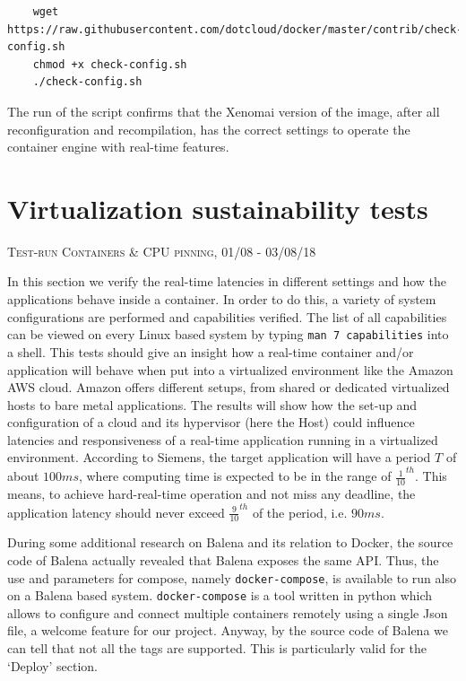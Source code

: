 \documentclass[]{scrartcl}
\begin{document}
\begin{verbatim}
	wget https://raw.githubusercontent.com/dotcloud/docker/master/contrib/check-config.sh
	chmod +x check-config.sh
	./check-config.sh
\end{verbatim}

The run of the script confirms that the Xenomai version of the image, after all reconfiguration and recompilation, has the correct settings to operate the container engine with real-time features.

\section{Virtualization sustainability tests}
\label{sec:virtsust}
{\small\textsc{Test-run Containers \& CPU pinning, 01/08 - 03/08/18} \bigskip}

In this section we verify the real-time latencies in different settings and how the applications behave inside a container. In order to do this, a variety of system configurations are performed and capabilities verified. The list of all capabilities can be viewed on every Linux based system by typing \texttt{man 7 capabilities} into a shell. This tests should give an insight how a real-time container and/or application will behave when put into a virtualized environment like the Amazon AWS cloud. Amazon offers different setups, from shared or dedicated virtualized hosts to bare metal applications. The results will show how the set-up and configuration of a cloud and its  hypervisor (here the Host) could influence latencies and responsiveness of a real-time application running in a virtualized environment. According to Siemens, the target application will have a period $T$ of about $100 ms$, where computing time is expected to be in the range of $\frac{1}{10}^{th}$. This means, to achieve hard-real-time operation and not miss any deadline, the application latency should never exceed $\frac{9}{10}^{th}$ of the period, i.e. $90 ms$.

During some additional research on Balena and its relation to Docker, the source code of Balena actually revealed that Balena exposes the same API. Thus, the use and parameters for compose, namely \texttt{docker-compose}, is available to run also on a Balena based system.
\texttt{docker-compose} is a tool written in python which allows to configure and connect multiple containers remotely using a single Json file, a welcome feature for our project.
Anyway, by the source code of Balena we can tell that not all the tags are supported. This is particularly valid for the `Deploy' section. 
\end{document}
